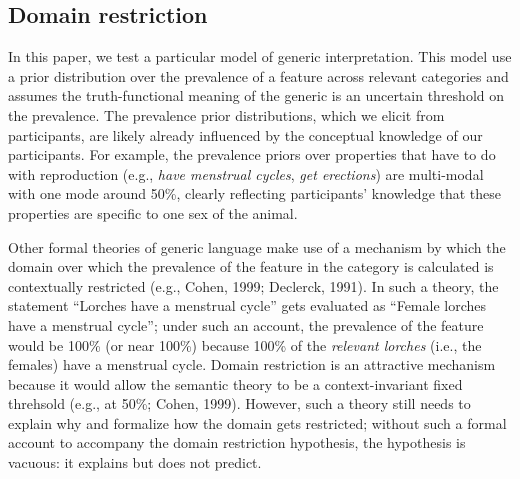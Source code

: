 \documentclass[floatsintext,doc]{apa6}
\theoremstyle{definition}
\theoremstyle{definition}
\theoremstyle{definition}
\theoremstyle{remark}
\begin{document}



\subsection{Domain restriction}\label{domain-restriction}

In this paper, we test a particular model of generic interpretation.
This model use a prior distribution over the prevalence of a feature
across relevant categories and assumes the truth-functional meaning of
the generic is an uncertain threshold on the prevalence. The prevalence
prior distributions, which we elicit from participants, are likely
already influenced by the conceptual knowledge of our participants. For
example, the prevalence priors over properties that have to do with
reproduction (e.g., \emph{have menstrual cycles}, \emph{get erections})
are multi-modal with one mode around 50\%, clearly reflecting
participants' knowledge that these properties are specific to one sex of
the animal.

Other formal theories of generic language make use of a mechanism by
which the domain over which the prevalence of the feature in the
category is calculated is contextually restricted (e.g., Cohen, 1999;
Declerck, 1991). In such a theory, the statement \enquote{Lorches have a
menstrual cycle} gets evaluated as \enquote{Female lorches have a
menstrual cycle}; under such an account, the prevalence of the feature
would be 100\% (or near 100\%) because 100\% of the \emph{relevant
lorches} (i.e., the females) have a menstrual cycle. Domain restriction
is an attractive mechanism because it would allow the semantic theory to
be a context-invariant fixed threhsold (e.g., at 50\%; Cohen, 1999).
However, such a theory still needs to explain why and formalize how the
domain gets restricted; without such a formal account to accompany the
domain restriction hypothesis, the hypothesis is vacuous: it explains
but does not predict.
\end{document}
